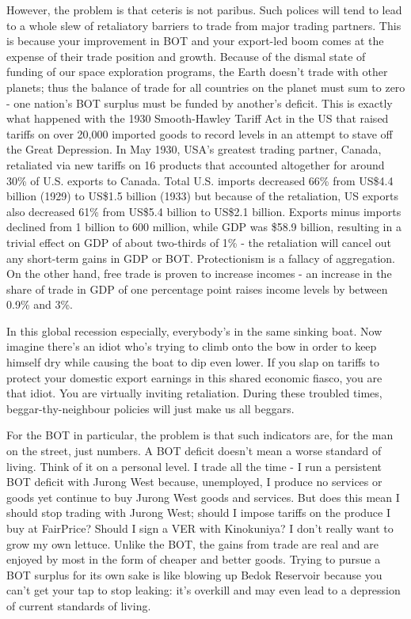 However, the problem is that ceteris is not paribus. Such polices will tend to lead to a whole slew of retaliatory barriers to trade from major trading partners. This is because your improvement in BOT and your export-led boom comes at the expense of their trade position and growth. Because of the dismal state of funding of our space exploration programs, the Earth doesn't trade with other planets; thus the balance of trade for all countries on the planet must sum to zero - one nation's BOT surplus must be funded by another's deficit. This is exactly what happened with the 1930 Smooth-Hawley Tariff Act in the US that raised tariffs on over 20,000 imported goods to record levels in an attempt to stave off the Great Depression. In May 1930, USA's greatest trading partner, Canada, retaliated via new tariffs on 16 products that accounted altogether for around 30\% of U.S. exports to Canada. Total U.S. imports decreased 66\% from US\$4.4 billion (1929) to US\$1.5 billion (1933) but because of the retaliation, US exports also decreased 61\% from US\$5.4 billion to US\$2.1 billion. Exports minus imports declined from 1 billion to 600 million, while GDP was \$58.9 billion, resulting in a trivial effect on GDP of about two-thirds of 1\% - the retaliation will cancel out any short-term gains in GDP or BOT. Protectionism is a fallacy of aggregation. On the other hand, free trade is proven to increase incomes - an increase in the share of trade in GDP of one percentage point raises income levels by between 0.9\% and 3\%.

In this global recession especially, everybody's in the same sinking boat. Now imagine there's an idiot who's trying to climb onto the bow in order to keep himself dry while causing the boat to dip even lower. If you slap on tariffs to protect your domestic export earnings in this shared economic fiasco, you are that idiot. You are virtually inviting retaliation. During these troubled times, beggar-thy-neighbour policies will just make us all beggars.

For the BOT in particular, the problem is that such indicators are, for the man on the street, just numbers. A BOT deficit doesn't mean a worse standard of living. Think of it on a personal level. I trade all the time - I run a persistent BOT deficit with Jurong West because, unemployed, I produce no services or goods yet continue to buy Jurong West goods and services. But does this mean I should stop trading with Jurong West; should I impose tariffs on the produce I buy at FairPrice? Should I sign a VER with Kinokuniya? I don't really want to grow my own lettuce. Unlike the BOT, the gains from trade are real and are enjoyed by most in the form of cheaper and better goods. Trying to pursue a BOT surplus for its own sake is like blowing up Bedok Reservoir because you can't get your tap to stop leaking: it's overkill and may even lead to a depression of current standards of living.


